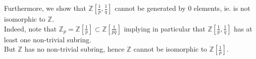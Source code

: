 \documentclass[11pt, a4paper]{article}
\begin{document}
Furthermore, we show that $ \mathbb{Z}\left[ \frac{1}{p},\frac{1}{q}\right]$ cannot be generated by 0 elements, ie. is not isomorphic to $\mathbb{Z}$.\\
Indeed, note that $ \mathbb{Z}_p = \mathbb{Z}\left[\frac{1}{p}\right] \subset \mathbb{Z}\left[ \frac{1}{pq}\right]$ implying in particular that $ \mathbb{Z}\left[ \frac{1}{p}, \frac{1}{q}\right] $ has at least one non-trivial subring.\\
But $ \mathbb{Z}$ has no non-trivial subring, hence $ \mathbb{Z}$ cannot be isomorphic to $ \mathbb{Z} \left[  \frac{1}{p}\right] $.
\end{document}
